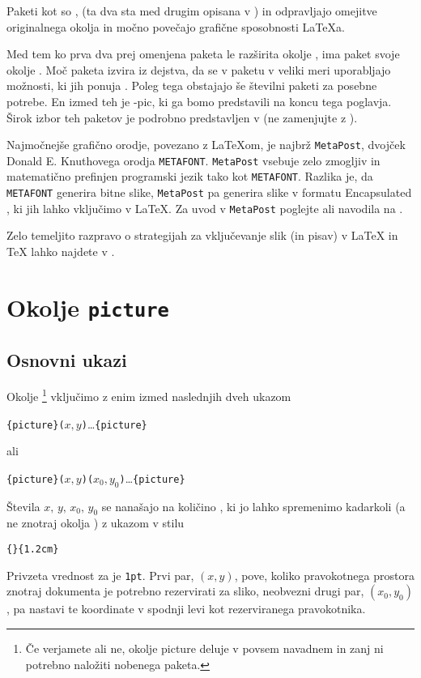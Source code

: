 Paketi kot so ,  
(ta dva sta med drugim opisana v \companion) in 
 odpravljajo omejitve originalnega okolja
 in močno povečajo grafične sposobnosti \LaTeX{}a.


Med tem ko prva dva prej omenjena paketa le razširita okolje
, ima paket  svoje okolje . 
Moč paketa  izvira iz dejstva, da se v paketu v veliki 
meri uporabljajo možnosti, ki jih ponuja \PSi{}.
Poleg tega obstajajo še številni paketi za posebne potrebe. En izmed
teh je 
\texorpdfstring{\Xy}{Xy}-pic, ki ga bomo predstavili na koncu tega poglavja.
Širok izbor teh paketov je podrobno predstavljen v \graphicscompanion{} 
(ne zamenjujte z \companion).


Najmočnejše grafično orodje, povezano z \LaTeX{}om, je najbrž
\texttt{MetaPost}, dvojček 
Donald E. Knuthovega orodja \texttt{METAFONT}. 
\texttt{MetaPost} vsebuje zelo zmogljiv in matematično prefinjen 
programski jezik tako kot \texttt{METAFONT}. Razlika je, da \texttt{METAFONT}
generira bitne slike, \texttt{MetaPost} pa generira slike v formatu 
Encapsulated \PSi{}, ki jih lahko vključimo v \LaTeX. Za uvod v 
\texttt{MetaPost} poglejte \hobby{} ali navodila na \cite{ursoswald}.

Zelo temeljito razpravo o strategijah za vključevanje slik (in
pisav) v \LaTeX{} in \TeX{} lahko najdete v \hoenig.

\section{Okolje \texttt{picture}}

\subsection{Osnovni ukazi}

Okolje \footnote{Če verjamete ali ne, okolje picture
deluje v povsem navadnem \LaTeXe{} in zanj ni potrebno 
naložiti nobenega paketa.} vključimo z enim izmed
naslednjih dveh ukazom
\begin{lscommand}
\verb|{picture}(|$x,y$\verb|)|\ldots{}\verb|{picture}|
\end{lscommand}
\noindent ali
\begin{lscommand}
\verb|{picture}(|$x,y$\verb|)(|$x_0,y_0$\verb|)|\ldots{}\verb|{picture}|
\end{lscommand}
Števila $x,\,y,\,x_0,\,y_0$ se nanašajo na količino , ki jo lahko
spremenimo kadarkoli
(a ne znotraj okolja ) z ukazom v stilu
\begin{lscommand}
\verb|{|\verb|}{1.2cm}|
\end{lscommand}
Privzeta vrednost za  je \texttt{1pt}. Prvi par, $(x,y)$, pove, koliko pravokotnega prostora znotraj dokumenta je potrebno rezervirati za sliko,
neobvezni drugi par, $(x_0,y_0)$, pa nastavi te koordinate v spodnji levi kot rezerviranega pravokotnika. 

